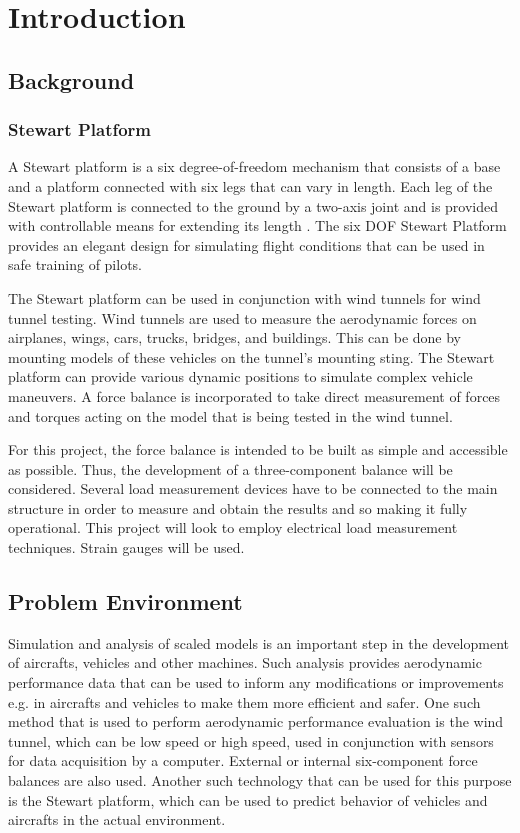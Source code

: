 \section{Introduction}
\label{sec:introduction}
\subsection{Background}
\subsubsection{Stewart Platform}
A Stewart platform is a six degree-of-freedom mechanism that consists of a base and a platform connected with six legs that can vary in length. Each leg of the Stewart platform is connected to the ground by a two-axis joint and is provided with controllable means for extending its length
\cite{wittenburg2016stewart}. The six DOF Stewart Platform provides an elegant design for simulating flight conditions that can be used in safe training of pilots\cite{stewart1965platform}. 

The Stewart platform can be used in conjunction with wind tunnels for wind tunnel testing. Wind tunnels are used to measure the aerodynamic forces on airplanes, wings, cars, trucks, bridges, and buildings. This can be done by mounting models of these vehicles on the tunnel's mounting sting. The Stewart platform can provide various dynamic positions to simulate complex vehicle maneuvers. A force balance is incorporated to take direct measurement of forces and torques acting on the model that is being tested in the wind tunnel.

For this project, the force balance is intended to be built as simple and accessible as possible. Thus, the development of a three-component balance will be considered. Several load measurement devices have to be connected to the main structure in order to measure and obtain the results and so making it fully operational. This project will look to employ electrical load measurement techniques. Strain gauges will be used.

\subsection{Problem Environment}
Simulation and analysis of scaled models is an important step in the development of aircrafts, vehicles and other machines. Such analysis provides aerodynamic performance data that can be used to inform any modifications or improvements e.g. in aircrafts and vehicles to make them more efficient and safer. One such method that is used to perform aerodynamic performance evaluation is the wind tunnel, which can be low speed or high speed, used in conjunction with sensors for data acquisition by a computer. External or internal six-component force balances are also used. Another such technology that can be used for this purpose is the Stewart platform, which can be used to predict behavior of vehicles and aircrafts in the actual environment.

